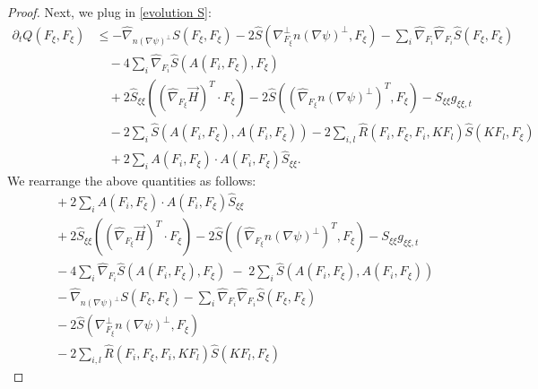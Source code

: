 \documentclass[10pt,a4paper]{amsart}
\newcommand{\maxidx}{\mathord{\xi}} %
\begin{document}
\begin{proof}
Next, we plug in \eqref{evolution S}:
\begin{align*}
\partial_{t}Q(F_{\maxidx},F_{\maxidx})
& \leq -\hat{\nabla}_{n\left( \nabla\psi\right)^{\perp}}
      S(F_{\maxidx},F_{\maxidx})
      -2\hat{S}\left( \nabla_{F_{\maxidx}}^{\perp} n\left(\nabla\psi\right)^{\perp},
      F_{\maxidx}\right)
      -\sum_{i}\hat{\nabla}_{F_{i}}\hat{\nabla}_{F_{i}}
      \hat{S}(F_{\maxidx},F_{\maxidx})\\
& \quad -4\sum_{i}\hat{\nabla}_{F_{i}}
      \hat{S}(A(F_{i},F_{\maxidx}),F_{\maxidx})\\
& \quad +2\hat{S}_{\maxidx\maxidx}\left(
        (\hat{\nabla}_{F_{\maxidx}}\vec{H})^{T}\cdot F_{\maxidx}\right)
      -2\hat{S}\left(
        (\hat{\nabla}_{F_{\maxidx}}n\left( \nabla\psi\right)^{\perp})^{T},
        F_{\maxidx}\right)
      -S_{\maxidx\maxidx} g_{\maxidx\maxidx,t}\\
& \quad -2\sum_{i}\hat{S}(A(F_{i},F_{\maxidx}),A(F_{i},F_{\maxidx}))
      -2\sum_{i,l}\hat{R}(F_{i},F_{\maxidx},F_{i},KF_{l})
         \hat{S}(KF_{l},F_{\maxidx})\\
& \quad +2\sum_{i}
      A(F_{i},F_{\maxidx})\cdot A(F_{i},F_{\maxidx})\hat{S}_{\maxidx\maxidx}.
\end{align*}
We rearrange the above quantities as follows:\begin{align*}
&\quad +2\sum_{i}A(F_{i},F_{\maxidx})\cdot A(F_{i},F_{\maxidx})\hat{S}_{\maxidx\maxidx}
\tag{1}\label{eq:L1}\\
&\quad +2\hat{S}_{\maxidx\maxidx}\left( (\hat{\nabla}_{F_{\maxidx}}\vec{H})^{T}\cdot F_{\maxidx}\right)
   -2\hat{S}\left( (\hat{\nabla}_{F_{\maxidx}}n(\nabla\psi)^{\perp})^{T},F_{\maxidx}\right)
   -S_{\maxidx\maxidx}g_{\maxidx\maxidx,t}
\tag{2}\label{eq:L2}\\
&\quad -4\sum_{i}\hat{\nabla}_{F_{i}}\hat{S}(A(F_{i},F_{\maxidx}),F_{\maxidx})
   \;-\;2\sum_{i}\hat{S}(A(F_{i},F_{\maxidx}),A(F_{i},F_{\maxidx}))
\tag{3}\label{eq:L3}\\
&\quad -\hat{\nabla}_{n(\nabla\psi)^{\perp}}S(F_{\maxidx},F_{\maxidx})
   -\sum_{i}\hat{\nabla}_{F_{i}}\hat{\nabla}_{F_{i}}\hat{S}(F_{\maxidx},F_{\maxidx})
\tag{4}\label{eq:L4}\\
&\quad -2\hat{S}\left( \nabla_{F_{\maxidx}}^{\perp}n(\nabla\psi)^{\perp},F_{\maxidx}\right)
\tag{5}\label{eq:L5}\\
&\quad -2\sum_{i,l}\hat{R}(F_{i},F_{\maxidx},F_{i},KF_{l})\hat{S}(KF_{l},F_{\maxidx})
\tag{6}\label{eq:L6}
\end{align*}


\end{proof}
\end{document}
